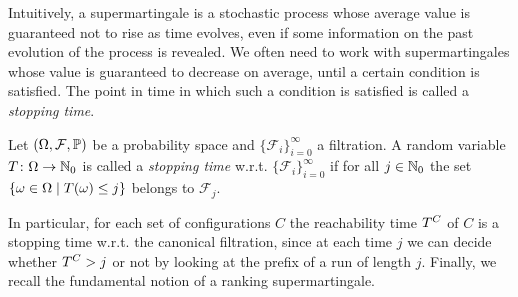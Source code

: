Intuitively, a supermartingale is a stochastic process whose average value is 
guaranteed not to rise as time evolves, even if some information on the past 
evolution of the process is revealed. 
We often need to work with supermartingales whose value 
is guaranteed to decrease on average, until a certain condition is 
satisfied. The point in time in which such a condition is satisfied is called a 
\emph{stopping time}.

\smallskip
\begin{definition}
Let $(\Omega,\mathcal{F},\mathbb{P})$ be a probability space and 
$\{\mathcal{F}_i\}_{i=0}^{\infty}$ a filtration. A random variable $T 
\colon 
\Omega\rightarrow \mathbb{N}_0$ is called a \emph{stopping time} w.r.t. 
$\{\mathcal{F}_i\}_{i=0}^{\infty}$ if %
for all $j\in \mathbb{N}_0$ the set $\{\omega\in \Omega\mid T(\omega)\leq j\}$ 
belongs to $\mathcal{F}_j$.
\end{definition}


In particular, for each set of configurations $C$ the reachability time 
$T^{C}$ of $C$ is a stopping time w.r.t. the canonical filtration, since 
at each time $j$ we can decide whether $T^{C}>j$ or not by looking at the 
prefix of a run of length $j$. 
Finally, we recall the fundamental notion of a ranking 
supermartingale.

